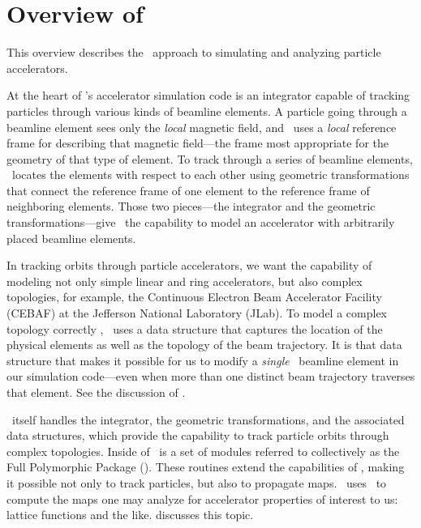 
\chapter{Overview of \PTC}
\label{cha:overview}


%
This overview describes the \PTC\ approach to simulating and analyzing
particle accelerators.

At the heart of \PTC's accelerator simulation code is an integrator
capable of tracking particles through various kinds of beamline
elements.  A particle going through a beamline element sees only the
\emph{local} magnetic field, and \PTC\ uses a \emph{local} reference
frame for describing that magnetic field---the frame most appropriate
for the geometry of that type of element.  To track through a series
of beamline elements, \PTC\ locates the elements with respect to each
other using geometric transformations that connect the reference frame
of one element to the reference frame of neighboring elements. Those
two pieces---the integrator and the geometric transformations---give
\PTC\ the capability to model an accelerator with arbitrarily placed
beamline elements.

In tracking orbits through particle accelerators, we want the capability
of modeling not only simple linear and ring accelerators, but also complex
topologies, for example, the Continuous Electron Beam Accelerator Facility
(CEBAF) at the Jefferson National Laboratory (JLab).  To model a complex
topology correctly%
,
\PTC\ uses a data structure that captures the location of the physical
elements as well as the topology of the beam trajectory.  It is that
data structure that makes it possible for us to modify a \emph{single}
\PTC\ beamline element in our simulation code---even when more than one
distinct beam trajectory traverses that element. See the discussion of
.

\PTC\ itself handles the integrator, the geometric transformations, and
the associated data structures, which provide the capability to track
particle orbits through complex topologies.  Inside of \PTC\ is a set
of modules referred to collectively as the Full Polymorphic Package
(\FPP).%
\cite{Forest:2006:FPP.PTC,Forest:2006:FPPDoc}
These routines extend the capabilities of \PTC, making it possible
not only to track particles, but also to propagate maps. \PTC\ uses
\FPP\ to compute the maps one may analyze for accelerator properties
of interest to us: lattice functions and the like.
 discusses this topic.

